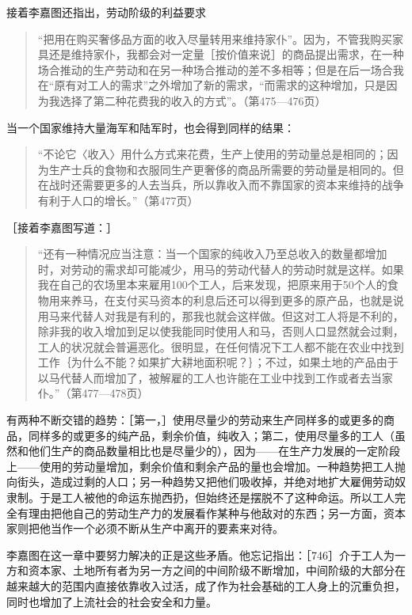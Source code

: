 接着李嘉图还指出，劳动阶级的利益要求

\begin{quote}{“把用在购买奢侈品方面的收入尽量转用来维持家仆”。因为，不管我购买家具还是维持家仆，我都会对一定量［按价值来说］的商品提出需求，在一种场合推动的生产劳动和在另一种场合推动的差不多相等；但是在后一场合我在“原有对工人的需求”之外增加了新的需求，“而需求的这种增加，只是因为我选择了第二种花费我的收入的方式”。（第475—476页）}\end{quote}

当一个国家维持大量海军和陆军时，也会得到同样的结果：

\begin{quote}{“不论它〈收入〉用什么方式来花费，生产上使用的劳动量总是相同的；因为生产士兵的食物和衣服同生产更奢侈的商品所需要的劳动量是相同的。但在战时还需要更多的人去当兵，所以靠收入而不靠国家的资本来维持的战争有利于人口的增长。”（第477页）}\end{quote}

［接着李嘉图写道：］

\begin{quote}{“还有一种情况应当注意：当一个国家的纯收入乃至总收入的数量都增加时，对劳动的需求却可能减少，用马的劳动代替人的劳动时就是这样。如果我在自己的农场里本来雇用100个工人，后来发现，把原来用于50个人的食物用来养马，在支付买马资本的利息后还可以得到更多的原产品，也就是说用马来代替人对我是有利的，那我也就会这样做。但这对工人将是不利的，除非我的收入增加到足以使我能同时使用人和马，否则人口显然就会过剩，工人的状况就会普遍恶化。很明显，在任何情况下工人都不能在农业中找到工作｛为什么不能？如果扩大耕地面积呢？｝；不过，如果土地的产品由于以马代替人而增加了，被解雇的工人也许能在工业中找到工作或者去当家仆。”（第477—478页）}\end{quote}

有两种不断交错的趋势：［第一，］使用尽量少的劳动来生产同样多的或更多的商品，同样多的或更多的纯产品，剩余价值，纯收入；第二，使用尽量多的工人（虽然和他们生产的商品数量相比也是尽量少的），因为——在生产力发展的一定阶段上——使用的劳动量增加，剩余价值和剩余产品的量也会增加。一种趋势把工人抛向街头，造成过剩的人口；另一种趋势又把他们吸收掉，并绝对地扩大雇佣劳动奴隶制。于是工人被他的命运东抛西扔，但始终还是摆脱不了这种命运。所以工人完全有理由把他自己的劳动生产力的发展看作某种与他敌对的东西；另一方面，资本家则把他当作一个必须不断从生产中离开的要素来对待。

李嘉图在这一章中要努力解决的正是这些矛盾。他忘记指出：［746］介于工人为一方和资本家、土地所有者为另一方之间的中间阶级不断增加，中间阶级的大部分在越来越大的范围内直接依靠收入过活，成了作为社会基础的工人身上的沉重负担，同时也增加了上流社会的社会安全和力量。

